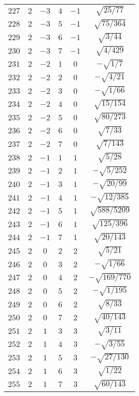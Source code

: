 \begin{table}
\begin{center}
\begin{tabular}{|c|c|c|c|c|c|}
$227$ & $2$ & $-3$ & $4$ & $-1$ & $\sqrt{25/77}$ \\ 
$228$ & $2$ & $-3$ & $5$ & $-1$ & $\sqrt{75/364}$ \\ 
$229$ & $2$ & $-3$ & $6$ & $-1$ & $\sqrt{3/44}$ \\ 
$230$ & $2$ & $-3$ & $7$ & $-1$ & $\sqrt{4/429}$ \\ 
$231$ & $2$ & $-2$ & $1$ & $0$ & $-\sqrt{1/7}$ \\ 
$232$ & $2$ & $-2$ & $2$ & $0$ & $-\sqrt{4/21}$ \\ 
$233$ & $2$ & $-2$ & $3$ & $0$ & $-\sqrt{1/66}$ \\ 
$234$ & $2$ & $-2$ & $4$ & $0$ & $\sqrt{15/154}$ \\ 
$235$ & $2$ & $-2$ & $5$ & $0$ & $\sqrt{80/273}$ \\ 
$236$ & $2$ & $-2$ & $6$ & $0$ & $\sqrt{7/33}$ \\ 
$237$ & $2$ & $-2$ & $7$ & $0$ & $\sqrt{7/143}$ \\ 
$238$ & $2$ & $-1$ & $1$ & $1$ & $\sqrt{5/28}$ \\ 
$239$ & $2$ & $-1$ & $2$ & $1$ & $-\sqrt{5/252}$ \\ 
$240$ & $2$ & $-1$ & $3$ & $1$ & $-\sqrt{20/99}$ \\ 
$241$ & $2$ & $-1$ & $4$ & $1$ & $-\sqrt{12/385}$ \\ 
$242$ & $2$ & $-1$ & $5$ & $1$ & $\sqrt{588/5209}$ \\ 
$243$ & $2$ & $-1$ & $6$ & $1$ & $\sqrt{125/396}$ \\ 
$244$ & $2$ & $-1$ & $7$ & $1$ & $\sqrt{20/143}$ \\ 
$245$ & $2$ & $0$ & $2$ & $2$ & $\sqrt{5/21}$ \\ 
$246$ & $2$ & $0$ & $3$ & $2$ & $-\sqrt{1/66}$ \\ 
$247$ & $2$ & $0$ & $4$ & $2$ & $-\sqrt{169/770}$ \\ 
$248$ & $2$ & $0$ & $5$ & $2$ & $-\sqrt{1/195}$ \\ 
$249$ & $2$ & $0$ & $6$ & $2$ & $\sqrt{8/33}$ \\ 
$250$ & $2$ & $0$ & $7$ & $2$ & $\sqrt{40/143}$ \\ 
$251$ & $2$ & $1$ & $3$ & $3$ & $\sqrt{3/11}$ \\ 
$252$ & $2$ & $1$ & $4$ & $3$ & $-\sqrt{3/55}$ \\ 
$253$ & $2$ & $1$ & $5$ & $3$ & $-\sqrt{27/130}$ \\ 
$254$ & $2$ & $1$ & $6$ & $3$ & $\sqrt{1/22}$ \\ 
$255$ & $2$ & $1$ & $7$ & $3$ & $\sqrt{60/143}$ \\ 

\end{tabular}
\end{center}
\end{table}
